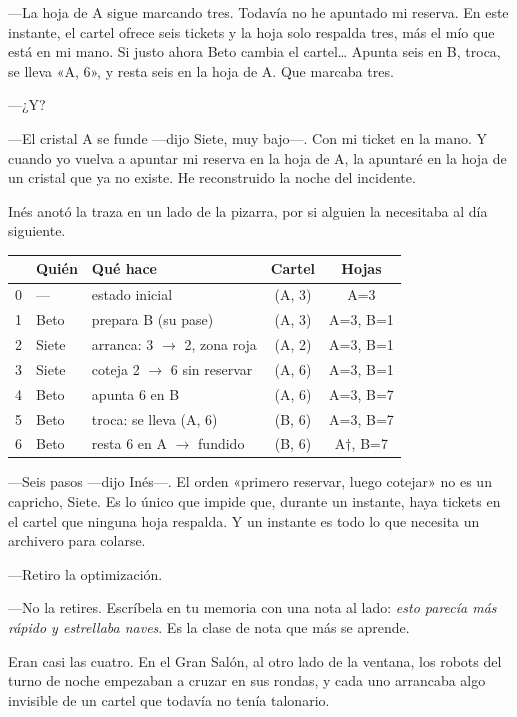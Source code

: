 ---La hoja de A sigue marcando tres. Todavía no he apuntado mi reserva. En este instante, el cartel ofrece seis tickets y la hoja solo respalda tres, más el mío que está en mi mano. Si justo ahora Beto cambia el cartel\ldots{} Apunta seis en B, troca, se lleva «A, 6», y resta seis en la hoja de A. Que marcaba tres.

---¿Y?

---El cristal A se funde ---dijo Siete, muy bajo---\nobreak. Con mi ticket en la mano. Y cuando yo vuelva a apuntar mi reserva en la hoja de A, la apuntaré en la hoja de un cristal que ya no existe. He reconstruido la noche del incidente.

Inés anotó la traza en un lado de la pizarra, por si alguien la necesitaba al día siguiente.

\begin{pizarra}
\begin{tabular}{@{}c l l c c@{}}
\toprule
& \textbf{Quién} & \textbf{Qué hace} & \textbf{Cartel} & \textbf{Hojas} \\
\midrule
0 & --- & estado inicial & (A, 3) & A=3 \\
1 & Beto & prepara B (su pase) & (A, 3) & A=3, B=1 \\
2 & Siete & arranca: 3 $\to$ 2, zona roja & (A, 2) & A=3, B=1 \\
3 & Siete & coteja 2 $\to$ 6 sin reservar & (A, 6) & A=3, B=1 \\
4 & Beto & apunta 6 en B & (A, 6) & A=3, B=7 \\
5 & Beto & troca: se lleva (A, 6) & (B, 6) & A=3, B=7 \\
6 & Beto & resta 6 en A $\to$ \textcolor{oxido}{fundido} & (B, 6) & A$\dagger$, B=7 \\
\bottomrule
\end{tabular}
\end{pizarra}

---Seis pasos ---dijo Inés---\nobreak. El orden «primero reservar, luego cotejar» no es un capricho, Siete. Es lo único que impide que, durante un instante, haya tickets en el cartel que ninguna hoja respalda. Y un instante es todo lo que necesita un archivero para colarse.

---Retiro la optimización.

---No la retires. Escríbela en tu memoria con una nota al lado: \emph{esto parecía más rápido y estrellaba naves}. Es la clase de nota que más se aprende.

\escena
Eran casi las cuatro. En el Gran Salón, al otro lado de la ventana, los robots del turno de noche empezaban a cruzar en sus rondas, y cada uno arrancaba algo invisible de un cartel que todavía no tenía talonario.

